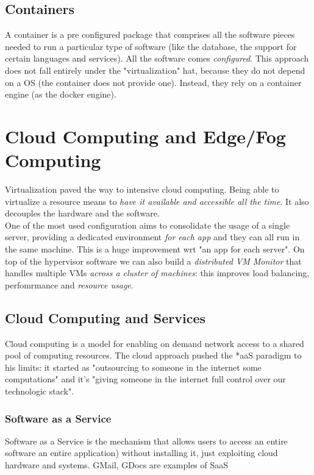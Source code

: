 \documentclass[10pt,a4paper]{article}
\begin{document}
			\subsection{Containers}
				A container is a pre configured package that comprises all the software pieces needed to run a particular type of software (like the database, the support for certain languages and services). All the software comes \emph{configured}. This approach does not fall entirely under the "virtualization" hat, because they do not depend on a OS (the container does not provide one). Instead, they rely on a container engine (as the docker engine).
				
		\section{Cloud Computing and Edge/Fog Computing}
			Virtualization paved the way to intensive cloud computing. Being able to virtualize a resource means to \emph{have it available and accessible all the time}. It also decouples the hardware and the software.\\
			One of the most used configuration aims to consolidate the usage of a single server, providing a dedicated environment \emph{for each app} and they can all run in the same machine. This is a huge improvement wrt "an app for each server". On top of the hypervisor software we can also build a \emph{distributed VM Monitor} that handles multiple VMs \emph{across a cluster of machines}: this improves load balancing, perfomrmance and \emph{resource usage}.\\
			
			\subsection{Cloud Computing and Services}
				Cloud computing is a model for enabling on demand network access to a shared pool of computing resources. The cloud approach pushed the *aaS paradigm to his limits: it started as "outsourcing to someone in the internet some computations" and it's "giving someone in the internet full control over our technologic stack".
				
				\subsubsection{Software as a Service}
					Software as a Service is the mechanism that allows users to access an entire software an entire application) without installing it, just exploiting cloud hardware and systems. GMail, GDocs are examples of SaaS
				
\end{document}
